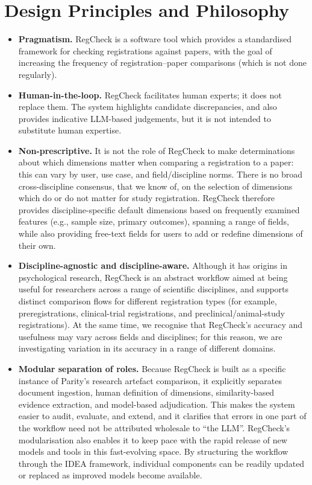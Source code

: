 \documentclass{article}
\begin{document}
\section{Design Principles and Philosophy}\label{app:design}
\begin{itemize}
  \item \textbf{Pragmatism.} RegCheck is a software tool which provides a
  standardised framework for checking registrations against papers, with the
  goal of increasing the frequency of registration--paper comparisons (which is
  not done regularly).
  \item \textbf{Human-in-the-loop.} RegCheck facilitates human experts; it does
  not replace them. The system highlights candidate discrepancies, and also
  provides indicative LLM-based judgements, but it is not intended to substitute
  human expertise.
  \item \textbf{Non-prescriptive.} It is not the role of RegCheck to make
  determinations about which dimensions matter when comparing a registration to
  a paper: this can vary by user, use case, and field/discipline norms. There is
  no broad cross-discipline consensus, that we know of, on the selection of
  dimensions which do or do not matter for study registration. RegCheck
  therefore provides discipline-specific default dimensions based on frequently
  examined features (e.g., sample size, primary outcomes), spanning a range of
  fields, while also providing free-text fields for users to add or redefine
  dimensions of their own.
  \item \textbf{Discipline-agnostic and discipline-aware.} Although it has
  origins in psychological research, RegCheck is an abstract workflow aimed at
  being useful for researchers across a range of scientific disciplines, and
  supports distinct comparison flows for different registration types (for
  example, preregistrations, clinical-trial registrations, and
  preclinical/animal-study registrations). At the same time, we recognise that
  RegCheck's accuracy and usefulness may vary across fields and disciplines;
  for this reason, we are investigating variation in its accuracy in a range of
  different domains.
  \item \textbf{Modular separation of roles.} Because RegCheck is built as a
  specific instance of Parity's research artefact comparison, it explicitly
  separates document ingestion, human definition of dimensions,
  similarity-based evidence extraction, and model-based adjudication. This
  makes the system easier to audit, evaluate, and extend, and it clarifies that
  errors in one part of the workflow need not be attributed wholesale to ``the
  LLM''. RegCheck's modularisation also enables it to keep pace with the rapid
  release of new models and tools in this fast-evolving space. By structuring
  the workflow through the IDEA framework, individual components can be readily
  updated or replaced as improved models become available.
\end{itemize}
\end{document}
